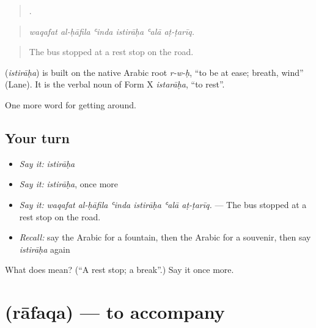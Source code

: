 \begin{quote}
     .
\end{quote}

\begin{quote}
\emph{waqafat al-ḥāfila ʿinda istirāḥa ʿalā aṭ-ṭarīq.}
\end{quote}

\begin{quote}
The bus stopped at a rest stop on the road.
\end{quote}

\begin{cousinweb}
\textbf{} (\emph{istirāḥa}) is built on the native Arabic root \emph{r-w-ḥ}, \textquotedblleft{}to be at ease; breath, wind\textquotedblright{} (Lane). It is the verbal noun of Form X \emph{istarāḥa}, \textquotedblleft{}to rest\textquotedblright{}.
\end{cousinweb}

\begin{grammarlens}[title={What you've built}]
One more word for getting around.
\end{grammarlens}

\subsection*{Your turn}
\begin{itemize}
\raggedright
  \item \emph{Say it:} \emph{istirāḥa}
  \item \emph{Say it:} \emph{istirāḥa}, once more
  \item \emph{Say it:} \emph{waqafat al-ḥāfila ʿinda istirāḥa ʿalā aṭ-ṭarīq.} — The bus stopped at a rest stop on the road.
  \item \emph{Recall:} say the Arabic for a fountain, then the Arabic for a souvenir, then say \emph{istirāḥa} again
\end{itemize}

\begin{tcolorbox}[breakable,colback=teal!4,colframe=teal!35!black,title={Before you move on}]
What does  mean? (\textquotedblleft{}A rest stop; a break\textquotedblright{}.) Say it once more.
\end{tcolorbox}
\section[\texorpdfstring{\ar{رافق} (rāfaqa)}{رافق (rāfaqa)}]{ (rāfaqa) — to accompany}

